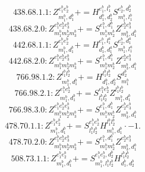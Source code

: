 \documentclass[letterpaper,10pt,fleqn,leqno,onecolumn]{article}
\begin{document}
\begin{equation} \;\;\;\;\;\;  438.68.1.1: Z^{e_{1}^{b}e_{2}^{b}}_{m_{1}^{b},d_{1}^{b}}+=H^{e_{1}^{b},l_{1}^{b}}_{d_{1}^{b},d_{2}^{b}}S^{e_{2}^{b},d_{2}^{b}}_{m_{1}^{b},l_{1}^{b}} \end{equation}
\begin{equation} \;\;\;\;\;\;  438.68.2.0: Z^{e_{1}^{b}e_{2}^{b}e_{3}^{b}}_{m_{1}^{b}m_{2}^{b}m_{3}^{b}}+=S^{e_{1}^{b},d_{1}^{b}}_{m_{1}^{b}m_{2}^{b}}Z^{e_{2}^{b}e_{3}^{b}}_{m_{3}^{b},d_{1}^{b}} \end{equation}
\begin{equation} \;\;\;\;\;\;  442.68.1.1: Z^{e_{1}^{b}e_{2}^{b}}_{m_{1}^{b},d_{1}^{b}}+=H^{e_{1}^{b},l_{1}^{a}}_{d_{1}^{b},d_{1}^{a}}S^{e_{2}^{b},d_{1}^{a}}_{m_{1}^{b},l_{1}^{a}} \end{equation}
\begin{equation} \;\;\;\;\;\;  442.68.2.0: Z^{e_{1}^{b}e_{2}^{b}e_{3}^{b}}_{m_{1}^{b}m_{2}^{b}m_{3}^{b}}+=S^{e_{1}^{b},d_{1}^{b}}_{m_{1}^{b}m_{2}^{b}}Z^{e_{2}^{b}e_{3}^{b}}_{m_{3}^{b},d_{1}^{b}} \end{equation}
\begin{equation} \;\;\;\;\;\;  766.98.1.2: Z^{l_{1}^{b}l_{2}^{b}}_{m_{1}^{b},d_{1}^{b}}+=H^{l_{1}^{b}l_{2}^{b}}_{d_{1}^{b},d_{2}^{b}}S^{d_{2}^{b}}_{m_{1}^{b}} \end{equation}
\begin{equation} \;\;\;\;\;\;  766.98.2.1: Z^{e_{1}^{b}e_{2}^{b}}_{m_{1}^{b},d_{1}^{b}}+=S^{e_{1}^{b}e_{2}^{b}}_{l_{1}^{b}l_{2}^{b}}Z^{l_{1}^{b}l_{2}^{b}}_{m_{1}^{b},d_{1}^{b}} \end{equation}
\begin{equation} \;\;\;\;\;\;  766.98.3.0: Z^{e_{1}^{b}e_{2}^{b}e_{3}^{b}}_{m_{1}^{b}m_{2}^{b}m_{3}^{b}}+=S^{e_{1}^{b},d_{1}^{b}}_{m_{1}^{b}m_{2}^{b}}Z^{e_{2}^{b}e_{3}^{b}}_{m_{3}^{b},d_{1}^{b}} \end{equation}
\begin{equation} \;\;\;\;\;\;  478.70.1.1: Z^{e_{1}^{b}e_{2}^{b}}_{m_{1}^{b},d_{1}^{b}}+=S^{e_{1}^{b}e_{2}^{b}}_{l_{1}^{b}l_{2}^{b}}H^{l_{1}^{b}l_{2}^{b}}_{m_{1}^{b},d_{1}^{b}}\cdot -1. \end{equation}
\begin{equation} \;\;\;\;\;\;  478.70.2.0: Z^{e_{1}^{b}e_{2}^{b}e_{3}^{b}}_{m_{1}^{b}m_{2}^{b}m_{3}^{b}}+=S^{e_{1}^{b},d_{1}^{b}}_{m_{1}^{b}m_{2}^{b}}Z^{e_{2}^{b}e_{3}^{b}}_{m_{3}^{b},d_{1}^{b}} \end{equation}
\begin{equation} \;\;\;\;\;\;  508.73.1.1: Z^{e_{1}^{b}e_{2}^{b}}_{m_{1}^{b},d_{1}^{b}}+=S^{e_{1}^{b}e_{2}^{b},d_{2}^{b}}_{m_{1}^{b},l_{1}^{b}l_{2}^{b}}H^{l_{1}^{b}l_{2}^{b}}_{d_{1}^{b},d_{2}^{b}} \end{equation}
\end{document}
